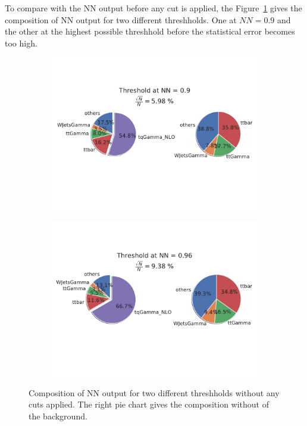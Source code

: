 To compare with the NN output before any cut is applied, the Figure~\ref{fig:full} gives the composition of NN output for two different threshholds. One at $NN = 0.9$ and the other at the highest possible threshhold before the statistical error becomes too high.
\begin{figure}
    \centering
    \begin{subfigure}[b]{0.6\textwidth}
       \includegraphics[width=1\linewidth]{Plots/composition9FULL.pdf}
    \end{subfigure}
    
    \begin{subfigure}[b]{0.6\textwidth}
       \includegraphics[width=1\linewidth]{Plots/compositionTenFULL.pdf}
    \end{subfigure}
    \caption{Composition of NN output for two different threshholds without any cuts applied. The right pie chart gives the composition without of the background.}
    \label{fig:full}
\end{figure}

